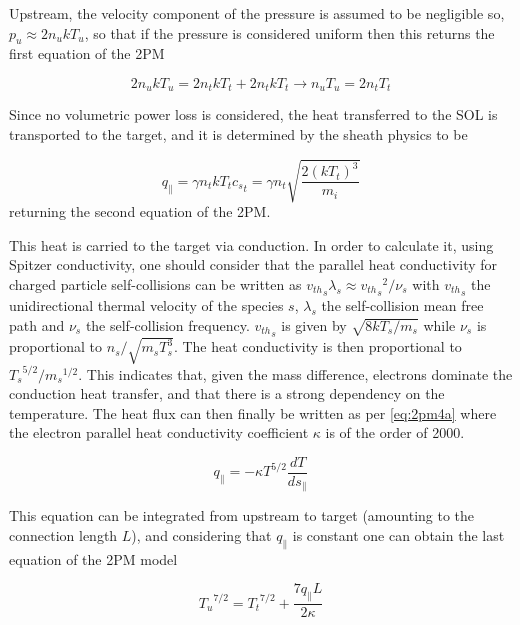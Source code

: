 Upstream, the velocity component of the pressure is assumed to be negligible so, $p_u \approx 2 n_u k T_u$, so that if the pressure is considered uniform then this returns the first equation of the 2PM

\begin{equation}
2 n_u k T_u = 2n_{t} k T_{t} + 2n_{t} k T_{t} \rightarrow n_u T_u = 2n_{t}T_{t}
\label{eq:2pm2}
\end{equation}

Since no volumetric power loss is considered, the heat transferred to the SOL is transported to the target, and it is determined by the sheath physics to be

\begin{equation}
q_{\parallel} =  \gamma n_t k T_t {c_s}_t = \gamma n_t \sqrt{\frac{2(kT_t)^3}{m_i}}
\label{eq:2pm3}
\end{equation}
returning the second equation of the 2PM.

This heat is carried to the target via conduction. In order to calculate it, using Spitzer conductivity\cite{Stangeby2001}, one should consider that the parallel heat conductivity for charged particle self-collisions can be written as ${v_{th}}_s \lambda_s \approx {{v_{th}}_s}^2/{\nu_s}$ with ${v_{th}}_s$ the unidirectional thermal velocity of the species $s$, $\lambda_s$ the self-collision mean free path and $\nu_s$ the self-collision frequency. ${v_{th}}_s$ is given by $\sqrt{8kT_s/{m_s}}$ while $\nu_s$ is proportional to $n_s/\sqrt{m_s T_s^3}$. The heat conductivity is then proportional to $ {T_s}^{5/2} / {m_s}^{1/2}$. This indicates that, given the mass difference, electrons dominate the conduction heat transfer, and that there is a strong dependency on the temperature. The heat flux can then finally be written as per \autoref{eq:2pm4a} where the electron parallel heat conductivity coefficient $\kappa$ is of the order of 2000.\cite{Stangeby2001}

\begin{equation}
q_{\parallel} = -\kappa T^{5/2} \frac{dT}{ds_{\parallel}}
\label{eq:2pm4a}
\end{equation}

This equation can be integrated from upstream to target (amounting to the connection length $L$), and considering that $q_{\parallel}$ is constant one can obtain the last equation of the 2PM model

\begin{equation}
{T_u}^{7/2} = {T_t}^{7/2} + \frac{7 q_{\parallel} L}{2 \kappa}
\label{eq:2pm4}
\end{equation}

